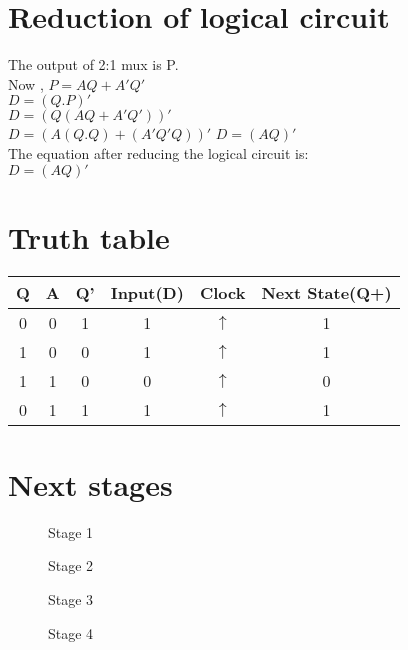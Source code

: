 \documentclass{article}
\begin{document}
\section{Reduction of logical circuit}
The output of 2:1 mux is P.\\
Now , $P=AQ+A'Q'$\\
$D=(Q.P)'$\\
$D=(Q(AQ+A'Q'))'$\\
 $D=(A(Q.Q)+(A'Q'Q))'$
 $D=(AQ)'$\\
 The equation after reducing the logical circuit is:\\
 $D=(AQ)'$\\

 \section{Truth table}
 \begin{table}[h]
  \centering
   \begin{tabular}{|c|c|c|c|c|c|}
   \hline
   Q & A & Q' & Input(D) & Clock & Next State(Q+)\\
   \hline
   0 & 0 & 1 & 1 & $\uparrow$ & 1\\
   \hline
   1 & 0 & 0 & 1 & $\uparrow$ & 1\\
   \hline
   1 & 1 & 0 & 0 & $\uparrow$ & 0\\
   \hline
   0 & 1 & 1 & 1 & $\uparrow$ & 1\\
   \hline
   \end{tabular}
   \end{table}
\section{Next stages}
\begin{figure}[h]
 \centering
 
 \caption{Stage 1}
\end{figure}
\pagebreak
\begin{figure}[h]
        \centering                                  
        \caption{Stage 2}
\end{figure}
\begin{figure}[h]
        \centering
 
 \caption{Stage 3}
\end{figure}
\pagebreak
\begin{figure}[h]
        \centering                                  
        \caption{Stage 4}
\end{figure} 
\end{document}
